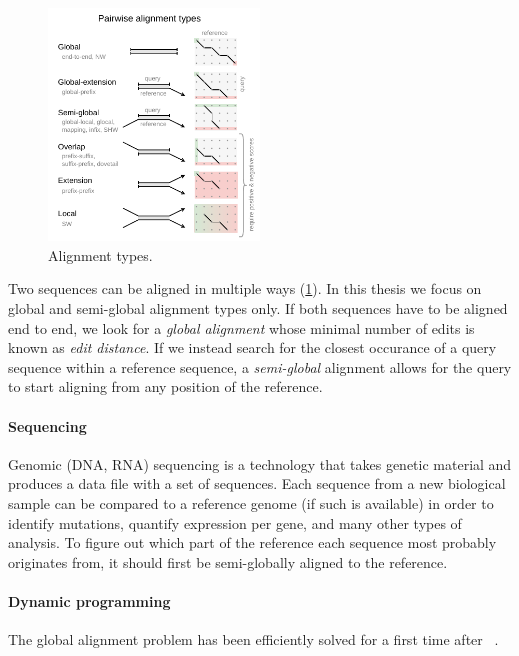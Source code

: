\begin{figure}[t]  %
    \includegraphics[width=0.5\textwidth]{alignment-types}
	\caption[Alignment types]{Alignment types.}
    \label{fig:alignment-types}
\end{figure}
Two sequences can be aligned in multiple ways (\cref{fig:alignment-types}). In
this thesis we focus on global and semi-global alignment types only. If both
sequences have to be aligned end to end, we look for a \emph{global alignment}
whose minimal number of edits is known as \emph{edit distance}. If we instead
search for the closest occurance of a query sequence within a reference
sequence, a \emph{semi-global} alignment allows for the query to start aligning
from any position of the reference.

\paragraph{Sequencing}
Genomic (DNA, RNA) sequencing is a technology that takes genetic material and
produces a data file with a set of sequences. Each sequence from a new
biological sample can be compared to a reference genome (if such is available)
in order to identify mutations, quantify expression per gene, and many other
types of analysis. To figure out which part of the reference each sequence most
probably originates from, it should first be semi-globally aligned to the
reference.

\paragraph{Dynamic programming}
The global alignment problem has been efficiently solved for a first time after
\citeyear{vintsyuk1968speech}~\cite{vintsyuk1968speech,needleman1970general}.

